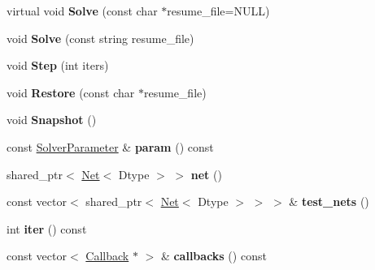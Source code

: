 \begin{DoxyCompactItemize}
virtual void {\bfseries Solve} (const char $\ast$resume\+\_\+file=N\+U\+LL)
\item 
\mbox{\label{classcaffe_1_1_solver_ac0be56a22aebd71d012e751c9e97c7e6}} 
void {\bfseries Solve} (const string resume\+\_\+file)
\item 
\mbox{\label{classcaffe_1_1_solver_a326b27a6807f57edda47d6d4525a823b}} 
void {\bfseries Step} (int iters)
\item 
\mbox{\label{classcaffe_1_1_solver_ac133985ef686e874f5bd326350d266d8}} 
void {\bfseries Restore} (const char $\ast$resume\+\_\+file)
\item 
\mbox{\label{classcaffe_1_1_solver_a54325448a46b2e5d05b8d3c03522c8f7}} 
void {\bfseries Snapshot} ()
\item 
\mbox{\label{classcaffe_1_1_solver_ae4c3a8528c6f35c0e82316f35799afa0}} 
const \mbox{\hyperlink{classcaffe_1_1_solver_parameter}{Solver\+Parameter}} \& {\bfseries param} () const
\item 
\mbox{\label{classcaffe_1_1_solver_aed1d6d3b5d8c3bf43dd33464af0c9de1}} 
shared\+\_\+ptr$<$ \mbox{\hyperlink{classcaffe_1_1_net}{Net}}$<$ Dtype $>$ $>$ {\bfseries net} ()
\item 
\mbox{\label{classcaffe_1_1_solver_a81216da761d9c24b0b25224d1b77e905}} 
const vector$<$ shared\+\_\+ptr$<$ \mbox{\hyperlink{classcaffe_1_1_net}{Net}}$<$ Dtype $>$ $>$ $>$ \& {\bfseries test\+\_\+nets} ()
\item 
\mbox{\label{classcaffe_1_1_solver_ae8ef547e6e2d8afd3910e75ac0283026}} 
int {\bfseries iter} () const
\item 
\mbox{\label{classcaffe_1_1_solver_a97be40eb471f0cf94b7d21c6942de4dc}} 
const vector$<$ \mbox{\hyperlink{classcaffe_1_1_solver_1_1_callback}{Callback}} $\ast$ $>$ \& {\bfseries callbacks} () const
\item 
\mbox{\label{classcaffe_1_1_solver_a5c712433c94e24bc0aa26179da5fc3d4}} 

\end{DoxyCompactItemize}
